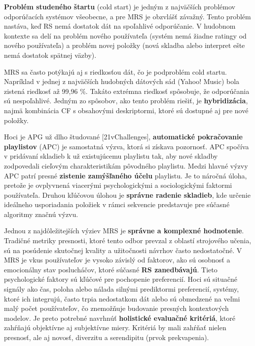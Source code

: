 \textbf{Problém studeného štartu} (cold start) je jedným z najväčších problémov odporúčacích systémov všeobecne, a pre MRS je obzvlášť závažný. Tento problém nastáva, keď RS nemá dostatok dát na spoľahlivé odporúčanie.\cite{challenges} V hudobnom kontexte sa delí na problém nového používateľa (systém nemá žiadne ratingy od nového používateľa) a problém novej položky (nová skladba alebo interpret ešte nemá dostatok spätnej väzby).\cite{challenges}

MRS sa často potýkajú aj s riedkosťou dát, čo je podproblém cold startu. Napríklad v jednej z najväčších hudobných dátových sád (Yahoo! Music) bola zistená riedkosť až 99,96 \%. Takáto extrémna riedkosť spôsobuje, že odporúčania sú nespoľahlivé.\cite{challenges} Jedným zo spôsobov, ako tento problém riešiť, je \textbf{hybridizácia}, najmä kombinácia CF s obsahovými deskriptormi, ktoré sú dostupné aj pre nové položky.\cite{Ricci}

Hoci je APG už dlho študované [21vChallenges], \textbf{automatické pokračovanie playlistov} (APC) je samostatná výzva, ktorá si získava pozornosť. APC spočíva v pridávaní skladieb k už existujúcemu playlistu tak, aby nové skladby zodpovedali cieľovým charakteristikám pôvodného playlistu.\cite{challenges}  Medzi hlavné výzvy APC patrí presné \textbf{zistenie zamýšľaného účelu} playlistu. Je to náročná úloha, pretože je ovplyvnená viacerými psychologickými a sociologickými faktormi používateľa. Druhou kľúčovou úlohou je \textbf{správne radenie skladieb}, kde určenie ideálneho usporiadania položiek v rámci sekvencie predstavuje pre súčasné algoritmy značnú výzvu.\cite{challenges}

Jednou z najdôležitejších výziev MRS je \textbf{správne a komplexné hodnotenie}. Tradičné metriky presnosti, ktoré tento odbor prevzal z oblastí strojového učenia, sú na posúdenie skutočnej kvality a užitočnosti návrhov často nedostatočné. \cite{challenges} V MRS je vkus používateľov je vysoko závislý od faktorov, ako sú osobnosť a emocionálny stav poslucháčov, ktoré súčasné \textbf{RS zanedbávajú}. Tieto psychologické faktory sú kľúčové pre pochopenie preferencií. \cite{challenges}
Hoci sú situačné signály ako čas, poloha alebo nálada silnými prediktormi preferencií, systémy, ktoré ich integrujú, často trpia nedostatkom dát alebo sú obmedzené na veľmi malý počet používateľov, čo znemožňuje budovanie presných kontextových modelov.\cite{challenges, 75vChallenges, 96vRicci, 109vRicci} Je preto potrebné navrhnúť \textbf{holistické evaluačné kritériá}, ktoré zahŕňajú objektívne aj subjektívne miery. Kritériá by mali zahŕňať nielen presnosť, ale aj novosť, diverzitu a serendipitu (prvok prekvapenia).\cite{challenges}


